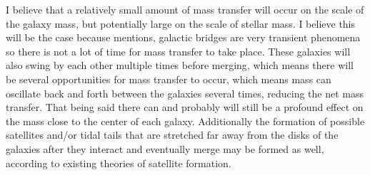 \documentclass[linenumbers]{aastex631}
\begin{document}
I believe that a relatively small amount of mass transfer will occur on the scale of the galaxy mass, but potentially large on the scale of stellar mass. I believe this will be the case because \cite{toomre1972galactic} mentions, galactic bridges are very transient phenomena so there is not a lot of time for mass transfer to take place. These galaxies will also swing by each other multiple times before merging, which means there will be several opportunities for mass transfer to occur, which means mass can oscillate back and forth between the galaxies several times, reducing the net mass transfer. That being said there can and probably will still be a profound effect on the mass close to the center of each galaxy. Additionally the formation of possible satellites and/or tidal tails that are stretched far away from the disks of the galaxies after they interact and eventually merge may be formed as well, according to existing theories of satellite formation. 

{}

\end{document}
